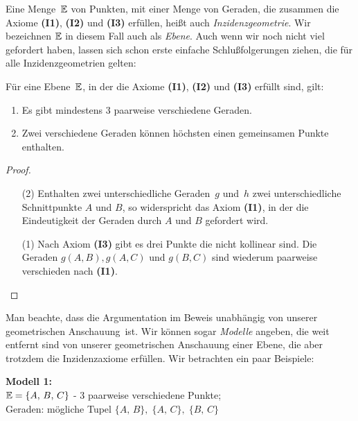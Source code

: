 Eine Menge~$\mathbb E$ von Punkten, mit einer Menge %
von Geraden, die zusammen die
Axiome  {\bf(I1)},  {\bf(I2)} und {\bf(I3)} erfüllen, heißt auch {\em
  Inzidenzgeometrie}. Wir bezeichnen $\mathbb E$ in diesem Fall auch als 
{\em Ebene}.
Auch wenn wir noch nicht viel gefordert haben, lassen sich schon
erste einfache Schlußfolgerungen ziehen, die für alle Inzidenzgeometrien gelten:


\begin{thm}
Für eine Ebene~$\mathbb E$, in der die Axiome {\bf(I1)},  {\bf(I2)} und
{\bf(I3)} erfüllt sind, gilt:
\begin{enumerate}
\item  Es gibt mindestens 3 paarweise verschiedene Geraden.

\item
Zwei verschiedene Geraden können höchsten einen gemeinsamen
  Punkte enthalten.

\end{enumerate}
\end{thm}

\begin{proof}
\begin{enumerate}
\item[(2)]
Enthalten zwei unterschiedliche Geraden~$g$ und~$h$ 
zwei unterschiedliche Schnittpunkte $A$ und $B$, so widerspricht das
Axiom {\bf(I1)}, in der die Eindeutigkeit der Geraden durch $A$ und
$B$ gefordert wird.

\item[(1)] Nach Axiom {\bf(I3)} gibt es drei Punkte die nicht kollinear
  sind. Die Geraden $g(A,B), g(A,C)$ und $g(B,C)$ 
sind wiederum paarweise verschieden nach {\bf(I1)}.

\end{enumerate}
\end{proof}


Man beachte, dass die Argumentation im Beweis unabhängig von unserer \glqq
geometrischen Anschauung\grqq\ ist. Wir können sogar {\em Modelle} angeben,
die weit entfernt sind von unserer geometrischen Anschauung einer Ebene,
die aber trotzdem die Inzidenzaxiome erfüllen. Wir betrachten ein paar Beispiele:


{\bf Modell 1:}\\ $\mathbb E=\{A,\,B,\,C\}$ - 3 paarweise
verschiedene Punkte;\\
Geraden: mögliche Tupel $\{A,\,B\},\;\{A,\,C\},\;\{B,\,C\}$


